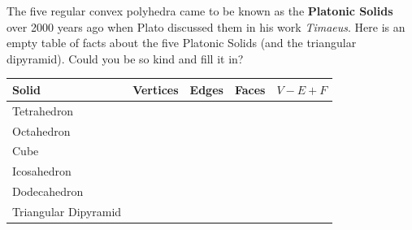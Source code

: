 \documentclass[noauthor,nooutcomes,hints,handout]{ximera}
\begin{document}
\mynewpage

\begin{question}
  The five regular convex polyhedra came to be known as the
  \textbf{Platonic Solids} over 2000 years ago
  when Plato discussed them in his work \textit{Timaeus}. Here is an
  empty table of facts about the five Platonic Solids (and the triangular dipyramid). Could you be so kind
  and fill it in?
  \begin{center}
    {
      \renewcommand{\arraystretch}{3}
      \begin{tabular}{|l||c|c|c|c|}\hline
        Solid & Vertices & Edges & Faces & $V - E + F$\\
        \hline\hline
        Tetrahedron &  &   &  &   \\ \hline
        Octahedron &   &  &  &  \\ \hline
        Cube &  &   &  & \\ \hline
        Icosahedron &  &  &  & \\ \hline
        Dodecahedron &  &  &  & \\ \hline
        Triangular Dipyramid &  &  &  & \\ \hline
\end{tabular}}
\end{center}
\end{question}
\end{document}
